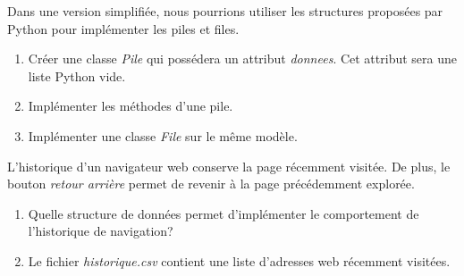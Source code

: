 \documentclass[a4paper,11pt]{article}
\begin{document}
\begin{Form}
\begin{exo}
Dans une version simplifiée, nous pourrions utiliser les structures proposées par Python pour implémenter les piles et files.
\begin{enumerate}
\item Créer une classe \emph{Pile} qui possédera un attribut \emph{donnees}. Cet attribut sera une liste Python vide.
\item Implémenter les méthodes d'une pile.
\item Implémenter une classe \emph{File} sur le même modèle.
\end{enumerate}
\end{exo}
\begin{exo}
L'historique d'un navigateur web conserve la page récemment visitée. De plus, le bouton \emph{retour arrière} permet de revenir à la page précédemment explorée.
\begin{enumerate}
\item Quelle structure de données permet d'implémenter le comportement de l'historique de navigation?
\item Le fichier \emph{historique.csv} contient une liste d'adresses web récemment visitées. 
\end{enumerate}
\end{exo}
\end{Form}
\end{document}

